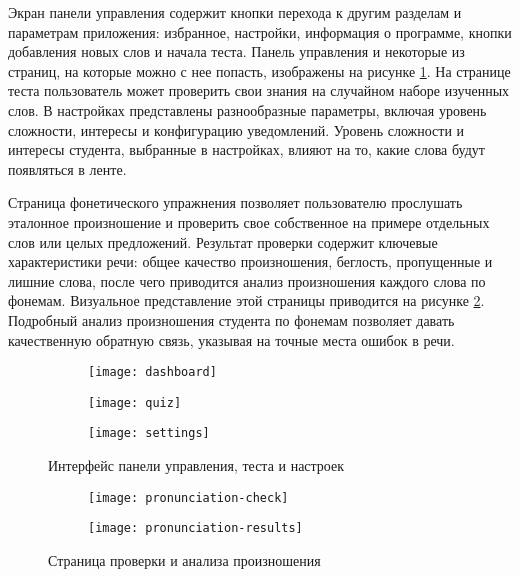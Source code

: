 Экран панели управления содержит кнопки перехода к другим разделам и параметрам приложения: избранное, настройки, информация о программе, кнопки добавления новых слов и начала теста. Панель управления и некоторые из страниц, на которые можно с нее попасть, изображены на рисунке \ref{fig:dashboard}. На странице теста пользователь может проверить свои знания на случайном наборе изученных слов. В настройках представлены разнообразные параметры, включая уровень сложности, интересы и конфигурацию уведомлений. Уровень сложности и интересы студента, выбранные в настройках, влияют на то, какие слова будут появляться в ленте.

Страница фонетического упражнения позволяет пользователю прослушать эталонное произношение и проверить свое собственное на примере отдельных слов или целых предложений. Результат проверки содержит ключевые характеристики речи: общее качество произношения, беглость, пропущенные и лишние слова, после чего приводится анализ произношения каждого слова по фонемам. Визуальное представление этой страницы приводится на рисунке \ref{fig:pronunciation-check}. Подробный анализ произношения студента по фонемам позволяет давать качественную обратную связь, указывая на точные места ошибок в речи.

\begin{figure}[H]
	\centering
	\begin{subfigure}{0.3\textwidth}
		\centering
		\texttt{[image: dashboard]}
	\end{subfigure}
	\begin{subfigure}{0.3\textwidth}
		\centering
		\texttt{[image: quiz]}
	\end{subfigure}
	\begin{subfigure}{0.3\textwidth}
		\centering
		\texttt{[image: settings]}
	\end{subfigure}
	\caption{Интерфейс панели управления, теста и настроек}
	\label{fig:dashboard}
\end{figure}

\begin{figure}[H]
	\centering
	\begin{subfigure}{0.3\textwidth}
		\centering
		\texttt{[image: pronunciation-check]}
	\end{subfigure}
	\hspace{0.2\textwidth}
	\begin{subfigure}{0.3\textwidth}
		\centering
		\texttt{[image: pronunciation-results]}
	\end{subfigure}
	\caption{Страница проверки и анализа произношения}
	\label{fig:pronunciation-check}
\end{figure}

